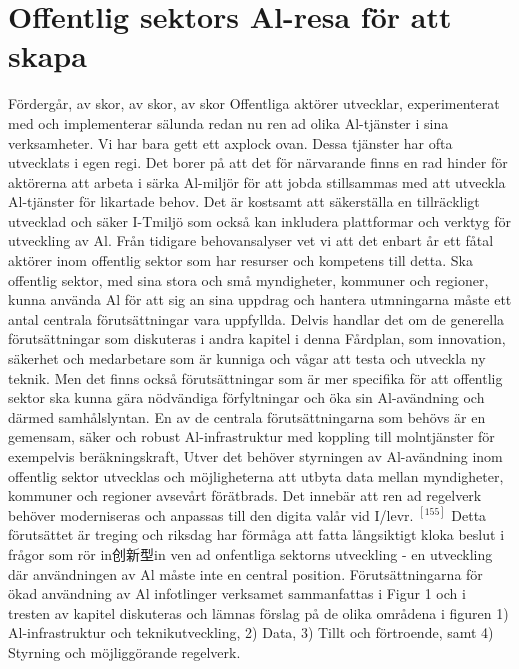 {{{{{{{{{{{{{{{\section*{Offentlig sektors Al-resa för att skapa}
Fördergår, av skor, av skor, av skor
Offentliga aktörer utvecklar, experimenterat med och implementerar sälunda redan nu ren ad olika Al-tjänster i sina verksamheter. Vi har bara gett ett axplock ovan. Dessa tjänster har ofta utvecklats i egen regi. Det borer på att det för närvarande finns en rad hinder för aktörerna att arbeta i särka Al-miljör för att jobda stillsammas med att utveckla Al-tjänster för likartade behov. Det är kostsamt att säkerställa en tillräckligt utvecklad och säker I-Tmiljö som också kan inkludera plattformar och verktyg för utveckling av Al.
Från tidigare behovansalyser vet vi att det enbart år ett fåtal aktörer inom offentlig sektor som har resurser och kompetens till detta.
Ska offentlig sektor, med sina stora och små myndigheter, kommuner och regioner, kunna använda Al för att sig an sina uppdrag och hantera utmningarna måste ett antal centrala förutsättningar vara uppfyllda. Delvis handlar det om de generella förutsättningar som diskuteras i andra kapitel i denna Fårdplan, som innovation, säkerhet och medarbetare som är kunniga och vågar att testa och utveckla ny teknik. Men det finns också förutsättningar som är mer specifika för att offentlig sektor ska kunna gära nödvändiga förfyltningar och öka sin Al-avändning och därmed samhålslyntan.
En av de centrala förutsättningarna som behövs är en gemensam, säker och robust Al-infrastruktur med koppling till molntjänster för exempelvis beräkningskraft, Utver det behöver styrningen av Al-avändning inom offentlig sektor utvecklas och möjligheterna att utbyta data mellan myndigheter, kommuner och regioner avsevårt förätbrads. Det innebär att ren ad regelverk behöver moderniseras och anpassas till den digita valår vid I/levr. \({ }^{[155]}\) Detta förutsättet är treging och riksdag har förmåga att fatta långsiktigt kloka beslut i frågor som rör in创新型in ven ad onfentliga sektorns utveckling - en utveckling där användningen av Al måste inte en central position.
Förutsättningarna för ökad användning av Al infotlinger verksamet sammanfattas i Figur 1 och i tresten av kapitel diskuteras och lämnas förslag på de olika områdena i figuren 1) Al-infrastruktur och teknikutveckling, 2) Data, 3) Tillt och förtroende, samt 4) Styrning och möjliggörande regelverk.

}}}}}}}}}}}}}}}
